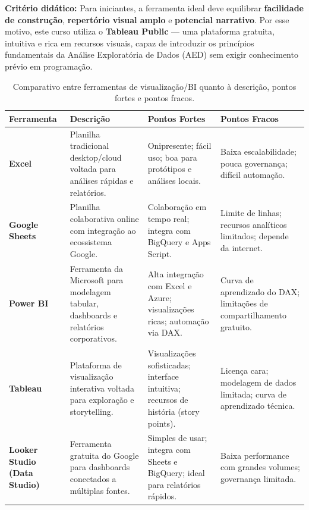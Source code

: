 \begin{NoteBox}
\textbf{Critério didático:}  
Para iniciantes, a ferramenta ideal deve equilibrar \textbf{facilidade de construção}, \textbf{repertório visual amplo} e \textbf{potencial narrativo}.  
Por esse motivo, este curso utiliza o \textbf{Tableau Public} — uma plataforma gratuita, intuitiva e rica em recursos visuais, capaz de introduzir os princípios fundamentais da Análise Exploratória de Dados (AED) sem exigir conhecimento prévio em programação.
\end{NoteBox}



\begin{table}[H]
\centering
\caption{Comparativo entre ferramentas de visualização/BI quanto à descrição, pontos fortes e pontos fracos.}
\label{tab:comparativo_ferramentas_bi}
\begin{tabular}{p{2.8cm} p{4cm} p{4cm} p{4cm}}
\hline
\textbf{Ferramenta} & \textbf{Descrição} & \textbf{Pontos Fortes} & \textbf{Pontos Fracos} \\ \hline

\textbf{Excel} &
Planilha tradicional desktop/cloud voltada para análises rápidas e relatórios. &
Onipresente; fácil uso; boa para protótipos e análises locais. &
Baixa escalabilidade; pouca governança; difícil automação. \\

\textbf{Google Sheets} &
Planilha colaborativa online com integração ao ecossistema Google. &
Colaboração em tempo real; integra com BigQuery e Apps Script. &
Limite de linhas; recursos analíticos limitados; depende da internet. \\

\textbf{Power BI} &
Ferramenta da Microsoft para modelagem tabular, dashboards e relatórios corporativos. &
Alta integração com Excel e Azure; visualizações ricas; automação via DAX. &
Curva de aprendizado do DAX; limitações de compartilhamento gratuito. \\

\textbf{Tableau} &
Plataforma de visualização interativa voltada para exploração e storytelling. &
Visualizações sofisticadas; interface intuitiva; recursos de história (story points). &
Licença cara; modelagem de dados limitada; curva de aprendizado técnica. \\

\textbf{Looker Studio (Data Studio)} &
Ferramenta gratuita do Google para dashboards conectados a múltiplas fontes. &
Simples de usar; integra com Sheets e BigQuery; ideal para relatórios rápidos. &
Baixa performance com grandes volumes; governança limitada. \\


\end{tabular}
\end{table}
